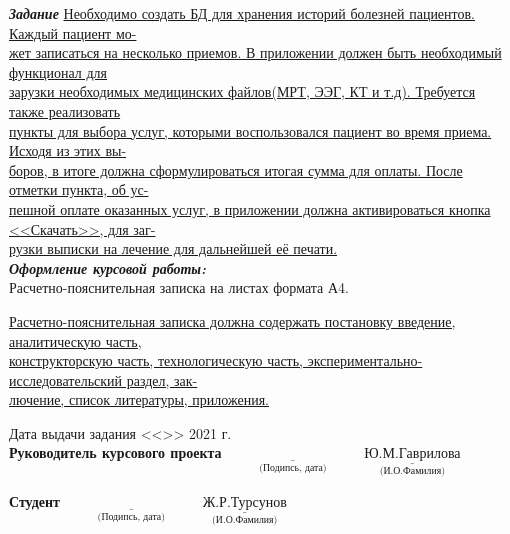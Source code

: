\documentclass[a4paper, 10pt]{article}
\begin{document}
\begin{titlepage}
	\normalsize {{ \textbf{\textit{Задание}}} \underline{Необходимо создать БД для хранения историй болезней пациентов. Каждый пациент мо-\hspace*{2mm}} \\ \underline{жет записаться на несколько приемов. В приложении должен быть необходимый функционал для\hspace*{3mm}} \\ \underline{зарузки необходимых медицинских файлов(МРТ, ЭЭГ, КТ и т.д). Требуется также реализовать\hspace*{6.7mm}} \\ \underline{пункты для выбора услуг, которыми воспользовался пациент во время приема. Исходя из этих вы-\hspace*{2mm}} \\ \underline{боров, в итоге должна сформулироваться итогая сумма для оплаты. После отметки пункта, об ус-\hspace*{3mm}} \\ \underline{пешной оплате оказанных услуг, в приложении должна активироваться кнопка <<Скачать>>, для заг-} \\ \underline{рузки выписки на лечение для дальнейшей её печати. \hspace*{73mm}}}
	\\ \normalsize {{\textbf{\textit{Оформление курсовой работы:}}}}
	\\ Расчетно-пояснительная записка на \underline{\hspace*{0.5cm}} листах формата А4.
	
	\underline{Расчетно-пояснительная записка должна содержать постановку введение, аналитическую часть,} \\ \underline{конструкторскую часть, технологическую часть, экспериментально-исследовательский раздел, зак-} \\ \underline{лючение, список литературы, приложения.}
		
	\begin{flushleft}
		\small Дата выдачи задания <<\underline{\hspace{1cm}}>> \underline{\hspace{3cm}} 2021 г.
		\newline
		\\ \small \textbf{Руководитель курсового проекта}
		\small \hspace{3cm}$\underset{\text{(Подипсь, дата)}}{\underline{\hspace{4cm}}}$ 
		\small \hspace{4mm}$\underset{\text{(И.О.Фамилия)}}{\underline{\text{Ю.М.Гаврилова}}}$ 
	\end{flushleft}
	\begin{flushleft}
		\small \textbf{Студент}
		\small \hspace{7.2cm}$\underset{\text{(Подипсь, дата)}}{\underline{\hspace{4cm}}}$ 
		\small \hspace{5mm}$\underset{\text{(И.О.Фамилия)}}{\underline{\text{Ж.Р.Турсунов}}}$ 
	\end{flushleft}
	
\end{titlepage}
\end{document}

